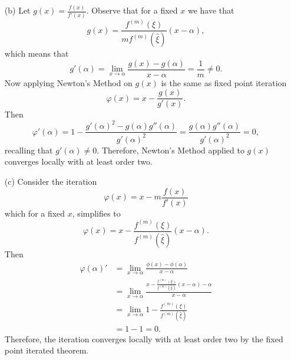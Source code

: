 \documentclass[12pt]{report}
\begin{document}
\begin{solution}
\begin{enumerate}
        \item [(b)]
        Let $g(x) = \frac{f(x)}{f'(x)}$. Observe that for a fixed $x$ we have that
        \[ 
            g(x) = \frac{f^{(m)}(\xi)}{mf^{(m)}(\hat{\xi})}(x - \alpha),
        \]
        which means that
        \[ 
            g'(\alpha) = \lim_{x \to \alpha} \frac{g(x) - g(\alpha)}{x - \alpha} = \frac{1}{m} \neq 0.
        \]
        Now applying Newton's Method on $g(x)$ is the same as fixed point iteration 
        \[ 
            \varphi(x) = x - \frac{g(x)}{g'(x)}.
        \]  
        Then
        \[ 
            \varphi'(\alpha) = 1 - \frac{g'(\alpha)^2 - g(\alpha)g''(\alpha)}{g'(\alpha)^2} = \frac{g(\alpha)g''(\alpha)}{g'(\alpha)^2} = 0,
        \]
        recalling that $g'(\alpha) \neq 0$. Therefore, Newton's Method applied to $g(x)$ converges locally with at least order two.  




        \item [(c)]
        Consider the iteration
        \[ 
            \varphi(x) = x - m \frac{f(x)}{f'(x)}
        \]
        which for a fixed $x$, simplifies to
        \[ 
            \varphi(x) = x - \frac{f^{(m)}(\xi)}{f^{(m)}(\hat{\xi})}(x - \alpha).
        \]
        Then
        \begin{align*}
            \varphi(\alpha)' &= \lim_{x \to \alpha} \frac{\phi(x) - \phi(\alpha)}{x - \alpha}\\ 
            &=  \lim_{x \to \alpha} \frac{x - \frac{f^{(m)}(\xi)}{f^{(m)}(\hat{\xi})}(x - \alpha) - \alpha}{x - \alpha}\\
            &= \lim_{x \to \alpha} 1 - \frac{f^{(m)}(\xi)}{f^{(m)}(\hat{\xi})}\\
            &= 1-1 = 0.
        \end{align*} 
        Therefore, the iteration converges locally with at least order two by the fixed point iterated theorem. 



    \end{enumerate}
\end{solution}

\newpage


\end{document}
